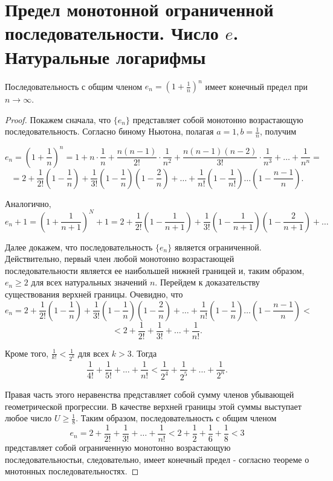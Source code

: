 \documentclass[14pt]{extreport}
\begin{document}
\section{Предел монотонной ограниченной последовательности. Число $e$. Натуральные логарифмы}
\begin{theorem}
Последовательность с общим членом $e_n=(1+\frac{1}{n})^n$ имеет конечный предел при $n\rightarrow\infty$.
\end{theorem}
\begin{proof}

Покажем сначала, что $\{e_n\}$ представляет собой монотонно возрастающую последовательность. Согласно биному Ньютона, полагая $a=1, b=\frac{1}{n}$, получим

$$e_n=\left(1+\frac{1}{n}\right)^n=1+n\cdot\frac{1}{n}+\frac{n(n-1)}{2!}\cdot\frac{1}{n^2}+\frac{n(n-1)(n-2)}{3!}\cdot\frac{1}{n^3}+\dots+\frac{1}{n^n}=$$ $$=2+\frac{1}{2!}\left(1-\frac{1}{n}\right)+\frac{1}{3!}\left(1-\frac{1}{n}\right)\left(1-\frac{2}{n}\right)+\dots+\frac{1}{n!}\left(1-\frac{1}{n!}\right)\dots\left(1-\frac{n-1}{n}\right).$$

Аналогично,
$$e_n+1=\left(1+\frac{1}{n+1}\right)^N+1=2+\frac{1}{2!}\left(1-\frac{1}{n+1}\right)+\frac{1}{3!}\left(1-\frac{1}{n+1}\right)\left(1-\frac{2}{n+1}\right)+\dots$$

Далее докажем, что последовательность $\{e_n\}$ является ограниченной. Действительно, первый член любой монотонно возрастающей последовательности является ее наибольшей нижней границей и, таким образом, $e_n\geqslant 2$ для всех натуральных значений $n$. Перейдем к доказательству существования верхней границы. Очевидно, что
$$e_n=2+\frac{1}{2!}\left(1-\frac{1}{n}\right)+\frac{1}{3!}\left(1-\frac{1}{n}\right)\left(1-\frac{2}{n}\right)+\dots+\frac{1}{n!}\left(1-\frac{1}{n}\right)\dots\left(1-\frac{n-1}{n}\right)<$$ $$<2+\frac{1}{2!}+\frac{1}{3!}+\dots+\frac{1}{n!}.$$

Кроме того, $\frac{1}{k!}<\frac{1}{2^k}$ для всех $k>3$. Тогда
$$\frac{1}{4!}+\frac{1}{5!}+\dots+\frac{1}{n!}<\frac{1}{2^4}+\frac{1}{2^5}+\dots+\frac{1}{2^n}.$$

Правая часть этого неравенства представляет собой сумму членов убывающей геометрической прогрессии. В качестве верхней границы этой суммы выступает любое число $U\geqslant\frac{1}{8}.$ Таким образом, последовательность с общим членом
$$e_n=2+\frac{1}{2!}+\frac{1}{3!}+\dots+\frac{1}{n!}<2+\frac{1}{2}+\frac{1}{6}+\frac{1}{8}<3$$
представляет собой ограниченную монотонно возрастающую последовательностьи, следовательно, имеет конечный предел - согласно теореме о мнотонных последовательностях.

\end{proof}
\end{document}
